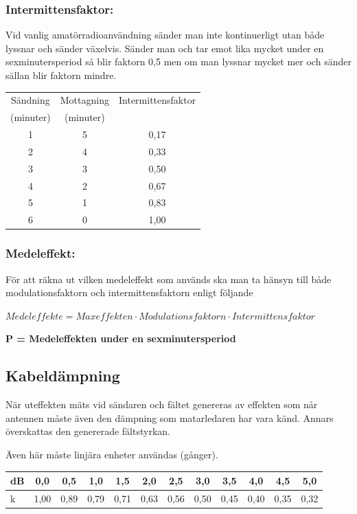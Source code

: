 \subsubsection{Intermittensfaktor:}

Vid vanlig amatörradioanvändning sänder man inte kontinuerligt utan
både lyssnar och sänder växelvis.
Sänder man och tar emot lika mycket under en sexminutersperiod så blir faktorn
0,5 men om man lyssnar mycket mer och sänder sällan blir faktorn mindre.

\begin{tabular}{|c|c|c|}
\hline
Sändning  & Mottagning & Intermittensfaktor \\
(minuter) & (minuter)  & \\ \hline
1 & 5 & 0,17 \\ \hline
2 & 4 & 0,33 \\ \hline
3 & 3 & 0,50 \\ \hline
4 & 2 & 0,67 \\ \hline
5 & 1 & 0,83 \\ \hline
6 & 0 & 1,00 \\ \hline
\end{tabular}

\subsubsection{Medeleffekt:}

För att räkna ut vilken medeleffekt som används ska man ta hänsyn
till både modulationsfaktorn och intermittensfaktorn enligt följande

\(Medeleffekte = Maxeffekten \cdot Modulationsfaktorn \cdot Intermittensfaktor\)

\textbf{P = Medeleffekten under en sexminutersperiod}

\subsection{Kabeldämpning}

När uteffekten mäts vid sändaren och fältet genereras av effekten som
når antennen måste även den dämpning som matarledaren har vara känd.
Annars överskattas den genererade fältstyrkan.

Även här måste linjära enheter användas (gånger).

\begin{tabular}{|l|c|c|c|c|c|c|c|c|c|c|c|}
\hline
dB & 0,0  & 0,5  & 1,0  & 1,5  & 2,0  & 2,5  & 3,0  & 3,5  & 4,0  & 4,5  & 5,0 \\ \hline
k  & 1,00 & 0,89 & 0,79 & 0,71 & 0,63 & 0,56 & 0,50 & 0,45 & 0,40 & 0,35 & 0,32 \\ \hline
\end{tabular}

